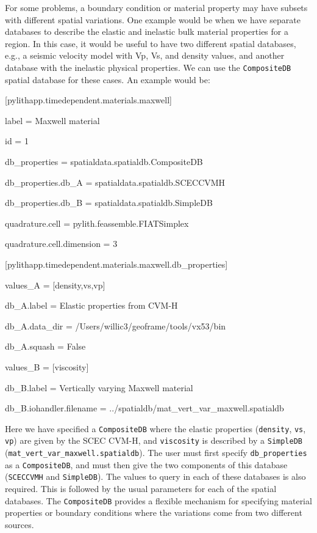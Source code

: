 For some problems, a boundary condition or material property may have
subsets with different spatial variations. One example would be when
we have separate databases to describe the elastic and inelastic bulk
material properties for a region. In this case, it would be useful
to have two different spatial databases, e.g., a seismic velocity
model with Vp, Vs, and density values, and another database with the
inelastic physical properties. We can use the \texttt{CompositeDB}
spatial database for these cases. An example would be:
\begin{lyxcode}
{[}pylithapp.timedependent.materials.maxwell{]}

label = Maxwell material

id = 1

db\_properties = spatialdata.spatialdb.CompositeDB

db\_properties.db\_A = spatialdata.spatialdb.SCECCVMH

db\_properties.db\_B = spatialdata.spatialdb.SimpleDB

quadrature.cell = pylith.feassemble.FIATSimplex

quadrature.cell.dimension = 3

 

{[}pylithapp.timedependent.materials.maxwell.db\_properties{]}

values\_A = {[}density,vs,vp{]}

db\_A.label = Elastic properties from CVM-H

db\_A.data\_dir = /Users/willic3/geoframe/tools/vx53/bin

db\_A.squash = False

values\_B = {[}viscosity{]}

db\_B.label = Vertically varying Maxwell material

db\_B.iohandler.filename = ../spatialdb/mat\_vert\_var\_maxwell.spatialdb
\end{lyxcode}
Here we have specified a \texttt{CompositeDB} where the elastic properties
(\texttt{density}, \texttt{vs}, \texttt{vp}) are given by the SCEC
CVM-H, and \texttt{viscosity} is described by a \texttt{SimpleDB}
(\texttt{mat\_vert\_var\_maxwell.spatialdb}). The user must first
specify \texttt{db\_properties} as a \texttt{CompositeDB}, and must
then give the two components of this database (\texttt{SCECCVMH} and
\texttt{SimpleDB}). The values to query in each of these databases
is also required. This is followed by the usual parameters for each
of the spatial databases. The \texttt{CompositeDB} provides a flexible
mechanism for specifying material properties or boundary conditions
where the variations come from two different sources.


